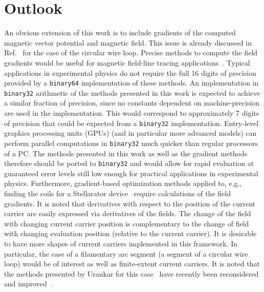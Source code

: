 \section{Outlook}
\label{sec:outlook}
An obvious extension of this work is to include gradients
of the computed magnetic vector potential and magnetic field.
This issue is already discussed in Ref.~\cite{walstrom_2017}
for the case of the circular wire loop.
%
Precise methods to compute the field gradients would be useful for magnetic field-line tracing applications~\cite{bozhenkov_2013}.
Typical applications in experimental physics do not require the full 16 digits of precision
provided by a \texttt{binary64} implementation of these methods.
An implementation in \texttt{binary32} arithmetic
of the methods presented in this work
is expected to achieve a similar fraction of precision,
since no constants dependent on machine-precision are used in the implementation.
This would correspond to approximately 7 digits of precision
that could be expected from a \texttt{binary32} implementation.
Entry-level graphics processing units (GPUs) (and in particular more advanced models)
can perform parallel computations in \texttt{binary32} much quicker than regular processors of a PC.
The methods presented in this work as well as the gradient methods therefore should be ported to \texttt{binary32}
and would allow for rapid evaluation at guaranteed error levels still low enough for practical applications in experimental physics.
%
Furthermore, gradient-based optimization methods applied to, e.g., finding the coils for a Stellarator device~\cite{zhu_2017,hudson_2018}
require calculations of the field gradients.
It is noted that derivatives with respect to the position of the current carrier
are easily expressed via derivatives of the fields.
The change of the field with changing current carrier position is complementary
to the change of field with changing evaluation position (relative to the current carrier).
%
It is desirable to have more shapes of current carriers implemented in this framework.
In particular, the case of a filamentary arc segment (a segment of a circular wire loop)
would be of interest as well as finite-extent current carriers.
It is noted that the methods presented by Urankar for this case~\cite{urankar_1,urankar_2,urankar_3,urankar_4,urankar_5}
have recently been reconsidered and improved~\cite{maurer_2020}.
